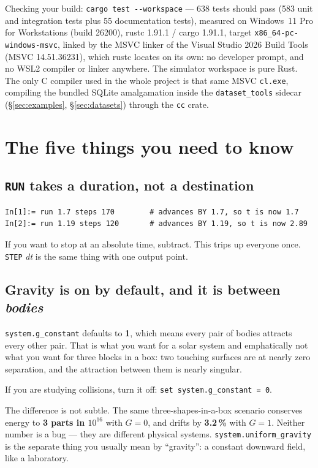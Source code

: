 \documentclass[11pt]{article}
\newcommand{\kw}[1]{\texttt{\uppercase{#1}}}
\newcommand{\code}[1]{\texttt{#1}}
\begin{document}
Checking your build: \code{cargo test -{}-workspace} --- 638 tests
should pass (583 unit and integration tests plus 55 documentation
tests), measured on Windows~11 Pro for Workstations (build 26200),
rustc 1.91.1 / cargo 1.91.1, target \code{x86\_64-pc-windows-msvc},
linked by the MSVC linker of the Visual Studio 2026 Build Tools (MSVC
14.51.36231), which rustc locates on its own: no developer prompt, and
no WSL2 compiler or linker anywhere. The simulator workspace is pure
Rust. The only C compiler used in the whole project is that same MSVC
\code{cl.exe}, compiling the bundled SQLite amalgamation inside the
\code{dataset\_tools} sidecar (\S\ref{sec:examples}, \S\ref{sec:datasets})
through the \code{cc} crate.

\section{The five things you need to know}

\subsection{\kw{run} takes a duration, not a destination}

\begin{lstlisting}
In[1]:= run 1.7 steps 170        # advances BY 1.7, so t is now 1.7
In[2]:= run 1.19 steps 120       # advances BY 1.19, so t is now 2.89
\end{lstlisting}

If you want to stop at an absolute time, subtract. This trips up
everyone once. \kw{step} \emph{dt} is the same thing with one output
point.

\subsection{Gravity is on by default, and it is between \emph{bodies}}
\label{sec:gravity}

\code{system.g\_constant} defaults to \textbf{1}, which means every pair
of bodies attracts every other pair. That is what you want for a solar
system and emphatically not what you want for three blocks in a box: two
touching surfaces are at nearly zero separation, and the attraction
between them is nearly singular.

If you are studying collisions, turn it off:
\code{set system.g\_constant = 0}.

The difference is not subtle. The same three-shapes-in-a-box scenario
conserves energy to \textbf{3 parts in $10^{16}$} with $G=0$, and drifts
by \textbf{3.2\,\%} with $G=1$. Neither number is a bug --- they are
different physical systems. \code{system.uniform\_gravity} is the
separate thing you usually mean by ``gravity'': a constant downward
field, like a laboratory.
\end{document}
